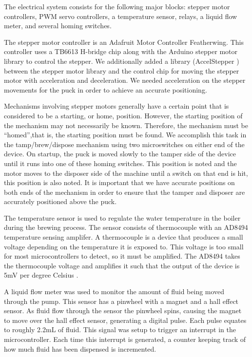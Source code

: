 \documentclass[conference]{IEEEtran}
\begin{document}
The electrical system consists for the following major
blocks: stepper motor controllers, PWM servo controllers, a
temperature sensor, relays, a liquid flow meter, and several
homing switches.

The stepper motor controller is an Adafruit Motor Controller
Featherwing. This controller uses a TB6613 H-bridge chip
along with the Arduino stepper motor library to control
the stepper. We additionally added a library (AccelStepper \cite{accel})
between the stepper motor library and the control chip for
moving the stepper motor with acceleration and deceleration.
We needed acceleration on the stepper movements for the puck
in order to achieve an accurate positioning.

Mechanisms involving stepper motors generally have a
certain point that is considered to be a starting, or home,
position. However, the starting position of the mechanism
may not necessarily be known. Therefore, the mechanism
must be ``homed'',that is, the starting position must be found.
We accomplish this task in the tamp/brew/dispose mechanism
using two microswitches on either end of the device. On
startup, the puck is moved slowly to the tamper side of the
device until it runs into one of these homing switches. This
position is noted and the motor moves to the disposer side of
the machine until a switch on that end is hit, this position is
also noted. It is important that we have accurate positions on
both ends of the mechanism in order to ensure that the tamper
and disposer are accurately positioned above the puck.

The temperature sensor is used to regulate the water temperature
in the boiler during the brewing process. The sensor
consists of thermocouple with an AD8494 temperature sensing
amplifer. A thermocouple is a device that produces a small
voltage depending on the temperature it is exposed to. This
voltage is too small for most microcontrollers to detect, so
it must be amplified. The AD8494 takes the thermocouple
voltage and amplifies it such that the output of the device is
5mV per degree Celsius \cite{thermo}.

A liquid flow meter was used to monitor the amount of fluid
being moved through the pump. This sensor has a pinwheel
with a magnet and a hall effect sensor. As fluid flow through
the sensor the pinwheel spins, causing the magnet to move
over the hall effect sensor, generating a digital pulse. Each
pulse equates to roughly 2.2mL of fluid. This signal was setup
to trigger an interrupt in the microcontroller. Each time this
interrupt is generated, a counter keeping track of how much
fluid has been dispensed is incremented.
\end{document}
